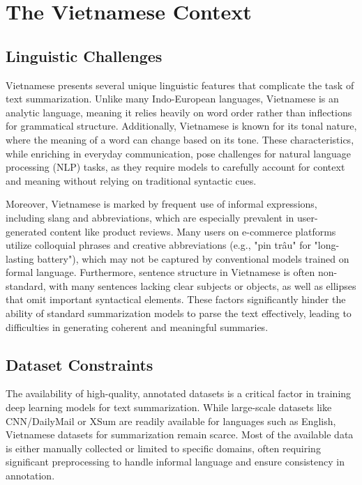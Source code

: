 \documentclass{article}
\begin{document}
\section{The Vietnamese Context}

\subsection{Linguistic Challenges}

Vietnamese presents several unique linguistic features that complicate the task of text summarization. Unlike many Indo-European languages, Vietnamese is an analytic language, meaning it relies heavily on word order rather than inflections for grammatical structure. Additionally, Vietnamese is known for its tonal nature, where the meaning of a word can change based on its tone. These characteristics, while enriching in everyday communication, pose challenges for natural language processing (NLP) tasks, as they require models to carefully account for context and meaning without relying on traditional syntactic cues.

Moreover, Vietnamese is marked by frequent use of informal expressions, including slang and abbreviations, which are especially prevalent in user-generated content like product reviews. Many users on e-commerce platforms utilize colloquial phrases and creative abbreviations (e.g., "pin trâu" for "long-lasting battery"), which may not be captured by conventional models trained on formal language. Furthermore, sentence structure in Vietnamese is often non-standard, with many sentences lacking clear subjects or objects, as well as ellipses that omit important syntactical elements. These factors significantly hinder the ability of standard summarization models to parse the text effectively, leading to difficulties in generating coherent and meaningful summaries.

\subsection{Dataset Constraints}

The availability of high-quality, annotated datasets is a critical factor in training deep learning models for text summarization. While large-scale datasets like CNN/DailyMail or XSum are readily available for languages such as English, Vietnamese datasets for summarization remain scarce. Most of the available data is either manually collected or limited to specific domains, often requiring significant preprocessing to handle informal language and ensure consistency in annotation.
\end{document}
